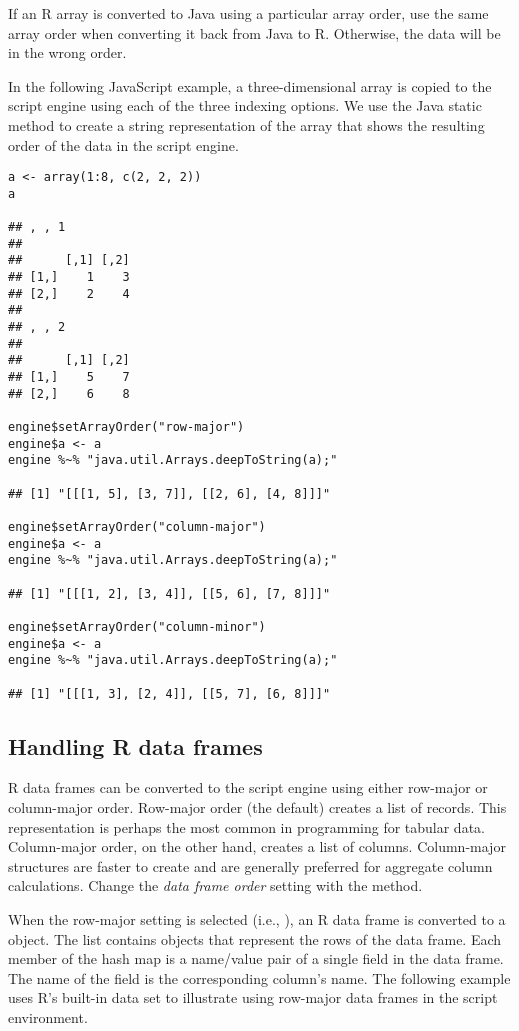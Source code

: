  If an R array is converted to Java using a particular array order, use the same array order when converting it back from Java to R. Otherwise, the data will be in the wrong order.

In the following JavaScript example, a three-dimensional array is copied to the script engine using each of the three indexing options. We use the Java static method  to create a string representation of the array that shows the resulting order of the data in the script engine.

\begin{verbatim}
a <- array(1:8, c(2, 2, 2))
a

## , , 1
##
##      [,1] [,2]
## [1,]    1    3
## [2,]    2    4
##
## , , 2
##
##      [,1] [,2]
## [1,]    5    7
## [2,]    6    8

engine$setArrayOrder("row-major")
engine$a <- a
engine %~% "java.util.Arrays.deepToString(a);"

## [1] "[[[1, 5], [3, 7]], [[2, 6], [4, 8]]]"

engine$setArrayOrder("column-major")
engine$a <- a
engine %~% "java.util.Arrays.deepToString(a);"

## [1] "[[[1, 2], [3, 4]], [[5, 6], [7, 8]]]"

engine$setArrayOrder("column-minor")
engine$a <- a
engine %~% "java.util.Arrays.deepToString(a);"

## [1] "[[[1, 3], [2, 4]], [[5, 7], [6, 8]]]"
\end{verbatim}

\hypertarget{handlingrdataframes}{\subsection{Handling R data frames}}

R data frames can be converted to the script engine using either row-major or column-major order. Row-major order (the default) creates a list of records. This representation is perhaps the most common in programming for tabular data. Column-major order, on the other hand, creates a list of columns. Column-major structures are faster to create and are generally preferred for aggregate column calculations. Change the \textit{data frame order} setting with the  method.

When the row-major setting is selected (i.e., ), an R data frame is converted to a \href{https://docs.oracle.com/javase/8/docs/api/java/util/ArrayList.html}{} object. The list contains  \href{https://docs.oracle.com/javase/8/docs/api/java/util/LinkedHashMap.html}{} objects that represent the rows of the data frame. Each member of the hash map is a name/value pair of a single field in the data frame. The name of the field is the corresponding column's name. The following example uses R's built-in  data set to illustrate using row-major data frames in the script environment.

